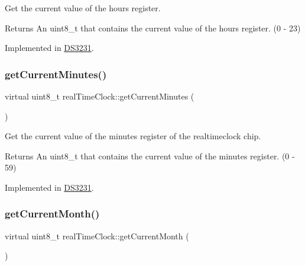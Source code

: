 Get the current value of the hours register. 

\begin{DoxyReturn}{Returns}
An uint8\+\_\+t that contains the current value of the hours register. (0 -\/ 23) 
\end{DoxyReturn}


Implemented in \mbox{\hyperlink{class_d_s3231_a019d8ed8074a02937c0777424be3d0ae}{D\+S3231}}.

\mbox{\label{classreal_time_clock_a8436f171be03d35a931004b3f3b144e9}} 
\subsubsection{\texorpdfstring{get\+Current\+Minutes()}{getCurrentMinutes()}}
{\footnotesize\ttfamily virtual uint8\+\_\+t real\+Time\+Clock\+::get\+Current\+Minutes (\begin{DoxyParamCaption}{ }\end{DoxyParamCaption})\hspace{0.3cm}{\ttfamily [pure virtual]}}



Get the current value of the minutes register of the realtimeclock chip. 

\begin{DoxyReturn}{Returns}
An uint8\+\_\+t that contains the current value of the minutes register. (0 -\/ 59) 
\end{DoxyReturn}


Implemented in \mbox{\hyperlink{class_d_s3231_a08f384e1897214d4a201aaaecde3b8a4}{D\+S3231}}.

\mbox{\label{classreal_time_clock_a24dd15babb345129fd995641946c5f2b}} 
\subsubsection{\texorpdfstring{get\+Current\+Month()}{getCurrentMonth()}}
{\footnotesize\ttfamily virtual uint8\+\_\+t real\+Time\+Clock\+::get\+Current\+Month (\begin{DoxyParamCaption}{ }\end{DoxyParamCaption})\hspace{0.3cm}{\ttfamily [pure virtual]}}



